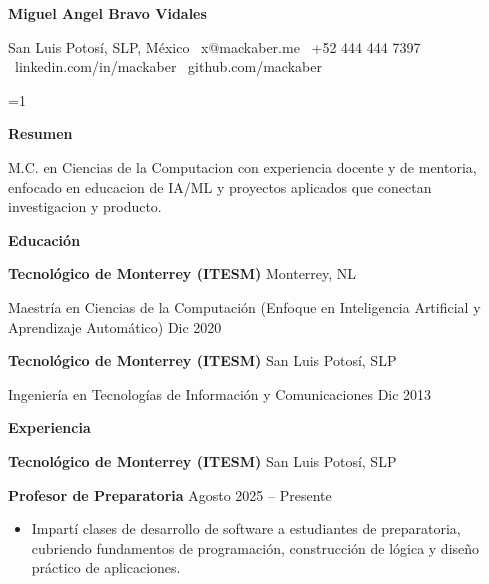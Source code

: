 \documentclass[11pt]{article}
\providecommand{\IncludeSummary}{1}
\newcommand{\ProfileSummary}{Ingeniero de IA con experiencia full-stack en construccion y entrega de sistemas en produccion con Python, Ruby on Rails, React y plataformas cloud.}
\renewcommand{\ProfileSummary}{M.C. en Ciencias de la Computacion con experiencia docente y de mentoria, enfocado en educacion de IA/ML y proyectos aplicados que conectan investigacion y producto.}
\begin{document}
\begin{center}
    \textbf{\LARGE Miguel Angel Bravo Vidales}\\ 
    \vspace{4pt}
    \hrulefill
\end{center}

\begin{center}
    San Luis Potosí, SLP, México \textbullet \ x@mackaber.me \textbullet \ +52 444 444 7397 \textbullet \ linkedin.com/in/mackaber \textbullet \ github.com/mackaber
\end{center}

\ifnum\IncludeSummary=1
\vspace{6pt}
\begin{center}
    \textbf{Resumen}
\end{center}
\ProfileSummary
\fi

\vspace{0.5pt}

\begin{center}
    \textbf{Educación}
\end{center}
\textbf{Tecnológico de Monterrey (ITESM)} \hfill Monterrey, NL

Maestría en Ciencias de la Computación (Enfoque en Inteligencia Artificial y Aprendizaje Automático) \hfill Dic 2020

\vspace{10pt}

\textbf{Tecnológico de Monterrey (ITESM)} \hfill San Luis Potosí, SLP

Ingeniería en Tecnologías de Información y Comunicaciones \hfill Dic 2013

\vspace{12pt}

\begin{center}
    \textbf{Experiencia}
\end{center}

\textbf{Tecnológico de Monterrey (ITESM)} \hfill San Luis Potosí, SLP

\textbf{Profesor de Preparatoria} \hfill Agosto 2025 -- Presente
\begin{itemize}[noitemsep, topsep=0pt, partopsep=0pt, parsep=0pt]
    \item Impartí clases de desarrollo de software a estudiantes de preparatoria, cubriendo fundamentos de programación, construcción de lógica y diseño práctico de aplicaciones.
\end{itemize}

\vspace{8pt}
\end{document}
